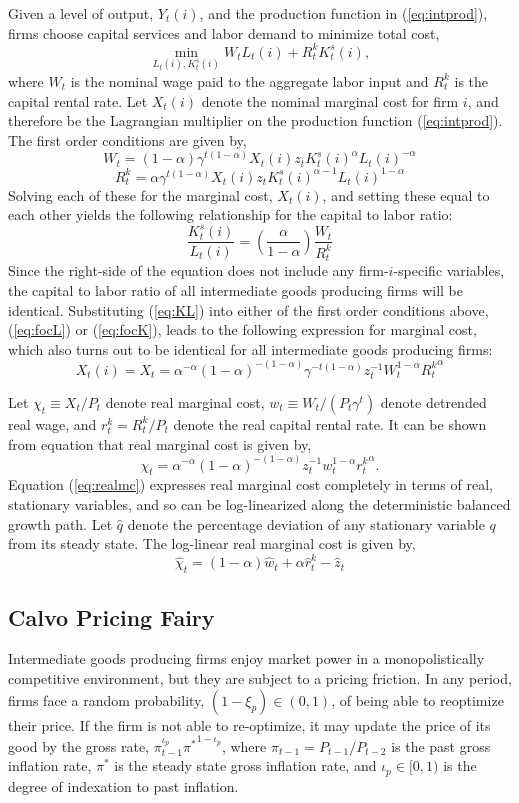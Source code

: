 \documentclass[11pt]{article}
\newcommand{\beq}{\begin{equation}}
\newcommand{\eeq}{\end{equation}}
\begin{document}
Given a level of output, $Y_t(i)$, and the production function in (\ref{eq:intprod}), firms choose capital services and labor demand to minimize total cost,
\beq \label{eq:intcost} \min_{L_t(i), K_t^s(i)} W_t L_t(i) + R_t^k K_t^s(i), \eeq
where $W_t$ is the nominal wage paid to the aggregate labor input and $R_t^k$ is the capital rental rate.  Let $X_t(i)$ denote the nominal marginal cost for firm $i$, and therefore be the Lagrangian multiplier on the production function (\ref{eq:intprod}).  The first order conditions are given by,
\beq \label{eq:focL} W_t = (1-\alpha) \gamma^{t(1-\alpha)} X_t(i) z_t K_t^s(i)^{\alpha} L_t(i)^{-\alpha} \eeq
\beq \label{eq:focK} R_t^k = \alpha \gamma^{t(1-\alpha)} X_t(i) z_t K_t^s(i)^{\alpha-1} L_t(i)^{1-\alpha} \eeq
 Solving each of these for the marginal cost, $X_t(i)$, and setting these equal to each other yields the following relationship for the capital to labor ratio:
\beq \label{eq:KL} \frac{K_t^s(i)}{L_t(i)} = \left( \frac{\alpha}{1-\alpha} \right) \frac{W_t}{R_t^k} \eeq
Since the right-side of the equation does not include any firm-$i$-specific variables, the capital to labor ratio of all intermediate goods producing firms will be identical.  Substituting (\ref{eq:KL}) into either of the first order conditions above, (\ref{eq:focL}) or (\ref{eq:focK}), leads to the following expression for marginal cost, which also turns out to be identical for all intermediate goods producing firms:
\beq \label{eq:mc} X_t(i) = X_t = \alpha^{-\alpha} (1-\alpha)^{-(1-\alpha)} \gamma^{-t(1-\alpha)} z_t^{-1} W_t ^{1-\alpha} {R_t^k}^{\alpha} \eeq

Let $\chi_{t} \equiv {X_t}/{P_t}$ denote real marginal cost, $w_t \equiv {W_t}/({P_t \gamma^t})$ denote detrended real wage, and $r_t^k = {R_t^k}/{P_t}$ denote the real capital rental rate.  It can be shown from equation \label{eq:mc} that real marginal cost is given by,
\beq \label{eq:realmc} \chi_t = \alpha^{-\alpha} (1-\alpha)^{-(1-\alpha)} z_t^{-1} w_t^{1-\alpha} {r_t^k}^{\alpha}. \eeq
Equation (\ref{eq:realmc}) expresses real marginal cost completely in terms of real, stationary variables, and so can be log-linearized along the deterministic balanced growth path.  Let $\hat{q}$ denote the percentage deviation of any stationary variable $q$ from its steady state.  The log-linear real marginal cost is given by,
\beq \label{eq:lnrealmc} \hat{\chi}_t = (1-\alpha) \hat{w}_t + \alpha \hat{r}_t^k - \hat{z}_t \eeq


\subsection{Calvo Pricing Fairy}
Intermediate goods producing firms enjoy market power in a monopolistically competitive environment, but they are subject to a pricing friction.  In any period, firms face a random probability, $(1-\xi_p) \in (0,1)$, of being able to reoptimize their price.  If the firm is not able to re-optimize, it may update the price of its good by the gross rate, $\pi_{t-1}^{\iota_p} {\pi^*}^{1-\iota_p}$, where $\pi_{t-1} = P_{t-1} / P_{t-2}$ is the past gross inflation rate, $\pi^*$ is the steady state gross inflation rate, and $\iota_p \in [0,1)$ is the degree of indexation to past inflation.
\end{document}
